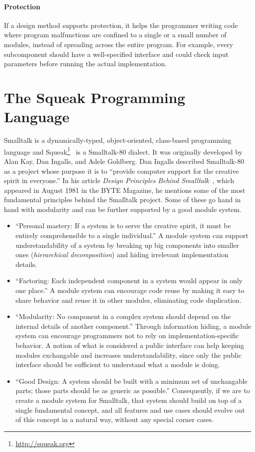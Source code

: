 \paragraph{Protection}
If a design method supports protection, it helps the programmer writing code where program malfunctions are confined to a single or a small number of modules, instead of spreading across the entire program. For example, every subcomponent should have a well-specified interface and could check input parameters before running the actual implementation.

\section{The Squeak Programming Language}
Smalltalk is a dynamically-typed, object-oriented, class-based programming language and Squeak\footnote{\url{http://squeak.org}}~\cite{Ingalls:1997:BFS:263698.263754} is a Smalltalk-80 dialect. It was originally developed by Alan Kay, Dan Ingalls, and Adele Goldberg. Dan Ingalls described Smalltalk-80 as a project whose purpose it is to ``provide computer support for the creative spirit in everyone.'' In his article \emph{Design Principles Behind Smalltalk}~\cite{Inga81a}, which appeared in August 1981 in the BYTE Magazine, he mentions some of the most fundamental principles behind the Smalltalk project. Some of these go hand in hand with modularity and can be further supported by a good module system.

\begin{itemize}
	\item ``Personal mastery: If a system is to serve the creative spirit, it must be entirely comprehensible to a single individual.'' A module system can support understandability of a system by breaking up big components into smaller ones (\emph{hierarchical decomposition}) and hiding irrelevant implementation details.
	\item ``Factoring: Each independent component in a system would appear in only one place.'' A module system can encourage code reuse by making it easy to share behavior and reuse it in other modules, eliminating code duplication. %
	\item ``Modularity: No component in a complex system should depend on the internal details of another component.'' Through information hiding, a module system can encourage programmers not to rely on implementation-specific behavior. A notion of what is considered a public interface can help keeping modules exchangable and increases understandability, since only the public interface should be sufficient to understand what a module is doing.
	\item ``Good Design: A system should be built with a minimum set of unchangable parts; those parts should be as generic as possible.'' Consequently, if we are to create a module system for Smalltalk, that system should build on top of a single fundamental concept, and all features and use cases should evolve out of this concept in a natural way, without any special corner cases.
\end{itemize}

